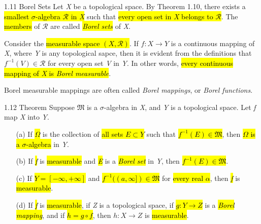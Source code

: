 \documentclass{article}
\begin{document}
\begin{defi}{1.11 Borel Sets}
	Let \textit{X} be a topological space. By Theorem 1.10, there exists a \hl{smallest $\sigma$-algebra $\mathscr{R}$ in \textit{X}} such that \hl{every open set in \textit{X} belongs to $\mathscr{R}$}. The \hl{members} of $\mathscr{R}$ are called \hl{\textit{Borel sets}} of \textit{X}.
	
\vspace{0.2cm}
	Consider the \hl{measurable space $(X,\mathscr{R})$}. If $f: X\rightarrow Y$ is a continuous mapping of \textit{X}, where \textit{Y} is any topological sapce, then it is evident from the definitions that $f^{-1}(V)\in\mathscr{R}$ for every open set \textit{V} in \textit{Y}. In other words, \hl{every continuous mapping of \textit{X} is \textit{Borel measurable}}. 
\vspace{0.2cm}

Borel measurable mappings are often called \textit{Borel mappings}, or \textit{Borel functions}.

\end{defi}

\begin{theo}{1.12 Theorem}
Suppose $\mathfrak{M}$ is a $\sigma$-algebra in \textit{X}, and \textit{Y} is a topological space. Let \textit{f} map \textit{X} into \textit{Y}.
	\begin{enumerate}
	\item [(a)] If \hl{$\Omega$} is the collection of \hl{all sets $E\subset Y$} such that \hl{$f^{-1}(E)\in\mathfrak{M}$}, then \hl{$\Omega$ is a $\sigma$-algebra} in \textit{Y}.
	\item [(b)] If \hl{\textit{f}} is \hl{measurable} and \hl{\textit{E}} is a \hl{\textit{Borel set}} in \textit{Y}, then \hl{$f^{-1}(E)\in\mathfrak{M}$}.
	\item [(c)] If \hl{$Y=[-\infty,+\infty]$} and \hl{$f^{-1}((a,\infty])\in\mathfrak{M}$} for \hl{every real $\alpha$}, then \hl{\textit{f}} is \hl{measurable}.
	\item [(d)] If \hl{\textit{f}} is \hl{measurable}, if \textit{Z} is a topological space, if \hl{$g: Y\rightarrow Z$} is a \hl{\textit{Borel mapping}}, and if \hl{$h=g\circ f$}, then $h: X\rightarrow Z$ is \hl{measurable}.


	\end{enumerate}
	
\end{theo}
\end{document}
